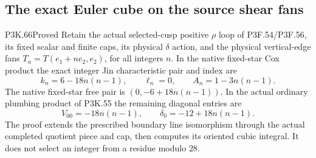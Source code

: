\subsection{The exact Euler cube on the source shear fans}
\begin{statement}{P3K.66}{Proved}
Retain the actual selected-cusp positive \(\rho\) loop of
P3F.54/P3F.56, its fixed scalar and finite caps, its physical \(\delta\)
action, and the physical vertical-edge fans
\(T_n=T(e_1+ne_2,e_2)\), for all integers \(n\).
In the native fixed-star Cox product the exact integer Jin
characteristic pair and index are
\[
 k_n=6-18n(n-1),\qquad \ell_n=0,\qquad
 A_n=1-3n(n-1).
\]
The native fixed-star free pair is
\((0,-6+18n(n-1))\). In the actual ordinary plumbing product of
P3K.55 the remaining diagonal entries are
\[
 V_{00}=-18n(n-1),\qquad
 \delta_0=-12+18n(n-1).
\]
The proof extends the prescribed boundary line isomorphism through
the actual completed quotient piece and cap, then computes its
oriented cubic integral. It does not select an integer from a
residue modulo \(28\).
\end{statement}
